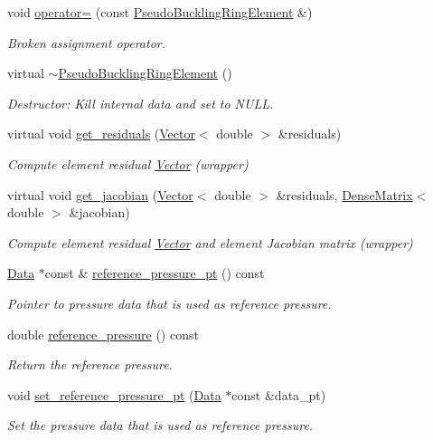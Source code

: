 \begin{DoxyCompactItemize}
void \hyperlink{classoomph_1_1PseudoBucklingRingElement_aadfdd6b002f132ab9593948ce331c5e9}{operator=} (const \hyperlink{classoomph_1_1PseudoBucklingRingElement}{Pseudo\+Buckling\+Ring\+Element} \&)
\begin{DoxyCompactList}\small\item\em Broken assignment operator. \end{DoxyCompactList}\item 
virtual \hyperlink{classoomph_1_1PseudoBucklingRingElement_aa5af05728c5249e65893fe00f19485ec}{$\sim$\+Pseudo\+Buckling\+Ring\+Element} ()
\begin{DoxyCompactList}\small\item\em Destructor\+: Kill internal data and set to N\+U\+LL. \end{DoxyCompactList}\item 
virtual void \hyperlink{classoomph_1_1PseudoBucklingRingElement_ad4f6c2b06b3f114dd08db33781484641}{get\+\_\+residuals} (\hyperlink{classoomph_1_1Vector}{Vector}$<$ double $>$ \&residuals)
\begin{DoxyCompactList}\small\item\em Compute element residual \hyperlink{classoomph_1_1Vector}{Vector} (wrapper) \end{DoxyCompactList}\item 
virtual void \hyperlink{classoomph_1_1PseudoBucklingRingElement_afa1eca6b17521ac4e9ca4367a695f500}{get\+\_\+jacobian} (\hyperlink{classoomph_1_1Vector}{Vector}$<$ double $>$ \&residuals, \hyperlink{classoomph_1_1DenseMatrix}{Dense\+Matrix}$<$ double $>$ \&jacobian)
\begin{DoxyCompactList}\small\item\em Compute element residual \hyperlink{classoomph_1_1Vector}{Vector} and element Jacobian matrix (wrapper) \end{DoxyCompactList}\item 
\hyperlink{classoomph_1_1Data}{Data} $\ast$const  \& \hyperlink{classoomph_1_1PseudoBucklingRingElement_aee6f3e5157ff065ddc132d24496b9378}{reference\+\_\+pressure\+\_\+pt} () const
\begin{DoxyCompactList}\small\item\em Pointer to pressure data that is used as reference pressure. \end{DoxyCompactList}\item 
double \hyperlink{classoomph_1_1PseudoBucklingRingElement_aff68b0969259a49194526660ed8a93a2}{reference\+\_\+pressure} () const
\begin{DoxyCompactList}\small\item\em Return the reference pressure. \end{DoxyCompactList}\item 
void \hyperlink{classoomph_1_1PseudoBucklingRingElement_a763b31017a3f39c0553182ad264a4057}{set\+\_\+reference\+\_\+pressure\+\_\+pt} (\hyperlink{classoomph_1_1Data}{Data} $\ast$const \&data\+\_\+pt)
\begin{DoxyCompactList}\small\item\em Set the pressure data that is used as reference pressure. \end{DoxyCompactList}\end{DoxyCompactItemize}
